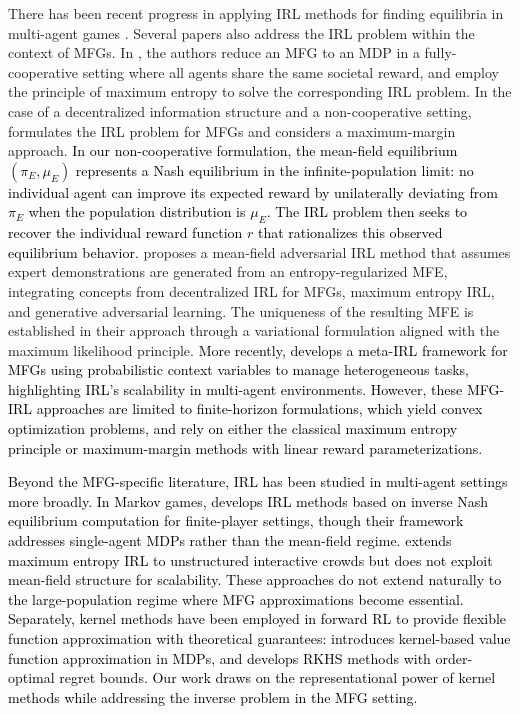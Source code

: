 \documentclass[11pt]{article}
\newcommand{\tb}[1]{\textcolor{black}{#1}} %
\begin{document}
There has been recent progress in applying IRL methods for finding equilibria in multi-agent games \cite{KOPF201714902,LIAN2022110524,9815022}. Several papers also address the IRL problem within the context of MFGs. In \cite{YaYeTrXuZh18}, the authors reduce an MFG to an MDP in a fully-cooperative setting where all agents share the same societal reward, and employ the principle of maximum entropy to solve the corresponding IRL problem. In the case of a decentralized information structure and a non-cooperative setting, \cite{YaLiLiHu22} formulates the IRL problem for MFGs and considers a maximum-margin approach. 
\tb{
In our non-cooperative formulation, the mean-field equilibrium $(\pi_E, \mu_E)$ represents a Nash equilibrium in the infinite-population limit: no individual agent can improve its expected reward by unilaterally deviating from $\pi_E$ when the population distribution is $\mu_E$. The IRL problem then seeks to recover the individual reward function $r$ that rationalizes this observed equilibrium behavior.} \cite{ChZhLiWi23} proposes a mean-field adversarial IRL method that assumes expert demonstrations are generated from an entropy-regularized MFE, integrating concepts from decentralized IRL for MFGs, maximum entropy IRL, and generative adversarial learning. The uniqueness of the resulting MFE is established in their approach through a variational formulation aligned with the maximum likelihood principle. 
\tb{
More recently, \cite{chen2024meta} develops a meta-IRL framework for MFGs using probabilistic context variables to manage heterogeneous tasks, highlighting IRL's scalability in multi-agent environments. However, these MFG-IRL approaches \cite{YaYeTrXuZh18, YaLiLiHu22, ChZhLiWi23, chen2024meta} are limited to finite-horizon formulations, which yield convex optimization problems, and rely on either the classical maximum entropy principle or maximum-margin methods with linear reward parameterizations.}



\tb{
Beyond the MFG-specific literature, IRL has been studied in multi-agent settings more broadly. In Markov games, \cite{LinAB19} develops IRL methods based on inverse Nash equilibrium computation for finite-player settings, though their framework addresses single-agent MDPs rather than the mean-field regime. \cite{chandra2025}  extends maximum entropy IRL to unstructured interactive crowds but does not exploit mean-field structure for scalability. These approaches do not extend naturally to the large-population regime where MFG approximations become essential.}
\tb{
Separately, kernel methods have been employed in forward RL to provide flexible function approximation with theoretical guarantees: \cite{TaylorP09} introduces kernel-based value function approximation in MDPs, and \cite{vakili2024kernelbased} develops RKHS methods with order-optimal regret bounds. 
Our work draws on the representational power of kernel methods while addressing the inverse problem in the MFG setting.}
\end{document}
